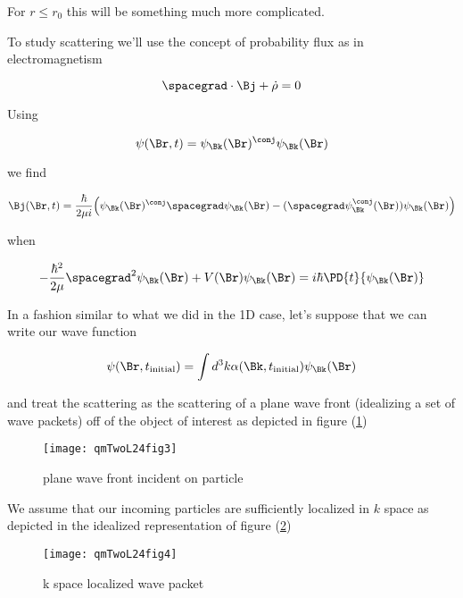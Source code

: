 For $r \le r_0$ this will be something much more complicated.

To study scattering we'll use the concept of probability flux as in electromagnetism

\begin{equation}\label{eqn:qmTwoL24:50}
\spacegrad \cdot \Bj + \dot{\rho} = 0
\end{equation}

Using

\begin{equation}\label{eqn:qmTwoL24:70}
\psi(\Br, t) =
\psi_\Bk(\Br)^\conj
\psi_\Bk(\Br)
\end{equation}

we find

\begin{equation}\label{eqn:qmTwoL24:90}
\Bj(\Br, t) = \frac{\hbar}{2 \mu i} \Bigl(
\psi_\Bk(\Br)^\conj \spacegrad \psi_\Bk(\Br)
- (\spacegrad \psi_\Bk^\conj(\Br)) \psi_\Bk(\Br)
\Bigr)
\end{equation}

when

\begin{equation}\label{eqn:qmTwoL24:110}
-\frac{\hbar^2}{2\mu} \spacegrad^2
\psi_\Bk(\Br)
+ V(\Br)
\psi_\Bk(\Br)
=
i \hbar \PD{t}{
\psi_\Bk(\Br)
}
\end{equation}

In a fashion similar to what we did in the 1D case, let's suppose that we can write our wave function

\begin{equation}\label{eqn:qmTwoL24:130}
\psi(\Br, t_{\text{initial}}) = \int d^3k \alpha(\Bk, t_{\text{initial}}) \psi_\Bk(\Br)
\end{equation}

and treat the scattering as the scattering of a plane wave front (idealizing a set of wave packets) off of the object of interest as depicted in figure (\ref{fig:qmTwoL24:qmTwoL24fig3})

\begin{figure}[htp]
   \centering
   \texttt{[image: qmTwoL24fig3]}
   \caption{plane wave front incident on particle}\label{fig:qmTwoL24:qmTwoL24fig3}
\end{figure}

We assume that our incoming particles are sufficiently localized in $k$ space as depicted in the idealized representation of figure (\ref{fig:qmTwoL24:qmTwoL24fig4})

\begin{figure}[htp]
   \centering
   \texttt{[image: qmTwoL24fig4]}
   \caption{k space localized wave packet}\label{fig:qmTwoL24:qmTwoL24fig4}
\end{figure}

